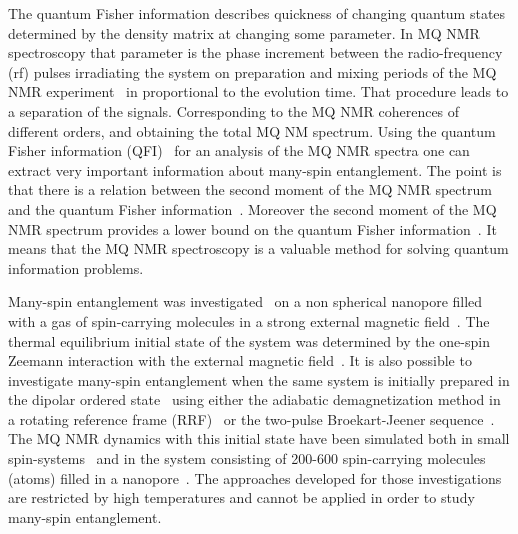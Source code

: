 \documentclass[review]{elsarticle}
\begin{document}
The quantum Fisher information describes quickness of changing quantum states determined by the density matrix at changing some parameter. 
In MQ NMR spectroscopy that parameter is the phase increment between the radio-frequency (rf) pulses irradiating the system on preparation and mixing periods of the MQ NMR experiment~\cite{Baum_1985} in proportional to the evolution time.
That procedure leads to a separation of the signals.
Corresponding to the MQ NMR coherences of different orders, and obtaining the total MQ NM spectrum.
Using the quantum Fisher information (QFI)~\cite{Liu_2014} for an analysis of the MQ NMR spectra one can extract very important information about many-spin entanglement.
The point is that there is a relation between the second moment of the MQ NMR spectrum~\cite{Khitrin_1997} and the quantum Fisher information~\cite{G_rttner_2018,Doronin_2019}.
Moreover the second moment of the MQ NMR spectrum provides a lower bound on the quantum Fisher information~\cite{G_rttner_2018}.
It means that the MQ NMR spectroscopy is a valuable method for solving quantum information problems.

Many-spin entanglement was investigated~\cite{Doronin_2019} on a non spherical nanopore filled with a gas of spin-carrying molecules in a strong external magnetic field~\cite{Baugh_2001,Doronin_2009}.
The thermal equilibrium initial state of the system was determined by the one-spin Zeemann interaction with the external magnetic field~\cite{Doronin_2007a}.
It is also possible to investigate many-spin entanglement when the same system is initially prepared in the dipolar ordered state~\cite{Andrew_1971} using either the adiabatic demagnetization method in a rotating reference frame (RRF)~\cite{Andrew_1971,Slichter_1961} or the two-pulse Broekart-Jeener sequence~\cite{Andrew_1971,Jeener_1967}.
The MQ NMR dynamics with this initial state have been simulated both in small spin-systems~\cite{Doronin_2007a,Doronin_2007b} and in the system consisting of 200-600 spin-carrying molecules (atoms) filled in a nanopore~\cite{Doronin_2011}.
The approaches developed for those investigations are restricted by high temperatures and cannot be applied in order to study many-spin entanglement.
\end{document}
